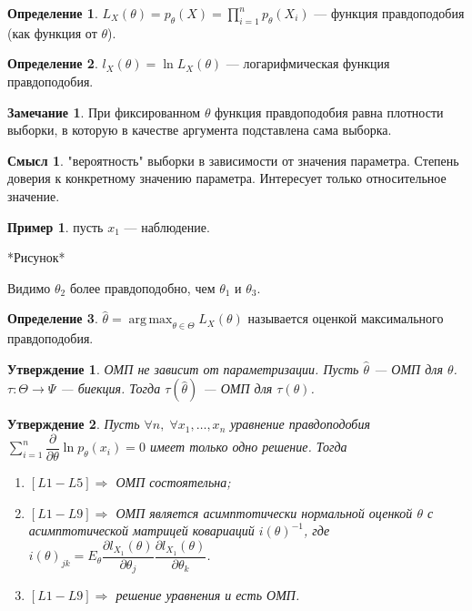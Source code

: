 \documentclass[12pt]{report}
\DeclareMathOperator*{\argmax}{arg\,max}
\newtheorem{proposition}{Утверждение}
\theoremstyle{definition}
\newtheorem{definition}{Определение}
\newtheorem{example}{Пример}
\newtheorem{sense}{Смысл}
\newtheorem{remark}{Замечание}
\begin{document}
\begin{definition}
	$L_X(\theta) = p_\theta(X) = \displaystyle{\prod_{i = 1}^n}p_\theta(X_i)$ — функция правдоподобия (как функция от $\theta$).
\end{definition}
\begin{definition}
	$l_X(\theta) = \ln L_X(\theta)$ — логарифмическая функция правдоподобия.
\end{definition}
\begin{remark}
	При фиксированном $\theta$ функция правдоподобия равна плотности выборки, в которую в качестве аргумента подставлена сама выборка.
\end{remark}
\begin{sense}
	"вероятность" выборки в зависимости от значения параметра. Степень доверия к конкретному значению параметра. Интересует только относительное значение.
\end{sense}
\begin{example}
	пусть $x_1$ — наблюдение.

	*Рисунок*

	Видимо $\theta_2$ более правдоподобно, чем $\theta_1$ и $\theta_3$.
\end{example}
\begin{definition}
	$\hat{\theta} = \argmax_{\theta \in \Theta} L_X(\theta)$ называется оценкой максимального правдоподобия.
\end{definition}
\begin{proposition}
	ОМП не зависит от параметризации. Пусть $\hat{\theta}$ — ОМП для $\theta$. $\tau : \Theta \rightarrow \Psi$ — биекция. Тогда $\tau(\hat{\theta})$ — ОМП для $\tau(\theta)$.
\end{proposition}
\begin{proposition}
	Пусть $\forall n,\;\forall x_1, \ldots,x_n$ уравнение правдоподобия $\displaystyle{\sum_{i=1}^n}\dfrac{\partial}{\partial \theta}\ln p_\theta(x_i) = 0$ имеет только одно решение. Тогда
	\begin{enumerate}
		\item $[L1-L5]\Rightarrow$ ОМП состоятельна;
		\item $[L1-L9]\Rightarrow$ ОМП является асимптотически нормальной оценкой $\theta$ с асимптотической матрицей ковариаций $i(\theta)^{-1}$, где $i(\theta)_{jk} = E_\theta \dfrac{\partial l_{X_1}(\theta)}{\partial \theta_j}\dfrac{\partial l_{X_1}(\theta)}{\partial \theta_k}$.
		\item $[L1-L9]\Rightarrow$ решение уравнения и есть ОМП.
	\end{enumerate}
\end{proposition}
\end{document}
